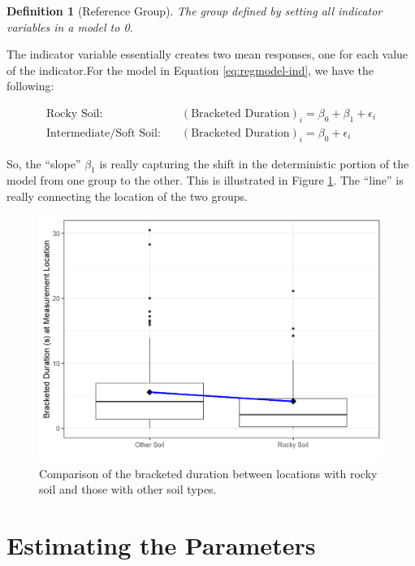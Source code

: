 \documentclass[
]{book}
\theoremstyle{plain}
\theoremstyle{mydefn}
\newtheorem{definition}{Definition}[chapter]
\theoremstyle{myexmpl}
\theoremstyle{remark}
\begin{document}
\begin{definition}[Reference Group]
\protect\hypertarget{def:defn-reference-group}{}{\label{def:defn-reference-group} {} }The group defined by setting all indicator variables in a model to 0.
\end{definition}

The indicator variable essentially creates two mean responses, one for each value of the indicator.For the model in Equation \eqref{eq:regmodel-ind}, we have the following:

\[
\begin{aligned}
  \text{Rocky Soil:} &\quad (\text{Bracketed Duration})_i = \beta_0 + \beta_1 + \epsilon_i\\
  \text{Intermediate/Soft Soil:} &\quad (\text{Bracketed Duration})_i = \beta_0 + \epsilon_i
\end{aligned}
\]

So, the ``slope'' \(\beta_1\) is really capturing the shift in the deterministic portion of the model from one group to the other. This is illustrated in Figure \ref{fig:regmodel-ind-plot}. The ``line'' is really connecting the location of the two groups.

\begin{figure}

{\centering \includegraphics[width=0.8\linewidth]{./Images/regmodel-ind-plot-1} 

}

\caption{Comparison of the bracketed duration between locations with rocky soil and those with other soil types.}\label{fig:regmodel-ind-plot}
\end{figure}

\hypertarget{estimating-the-parameters}{%
\section{Estimating the Parameters}\label{estimating-the-parameters}}
\end{document}
